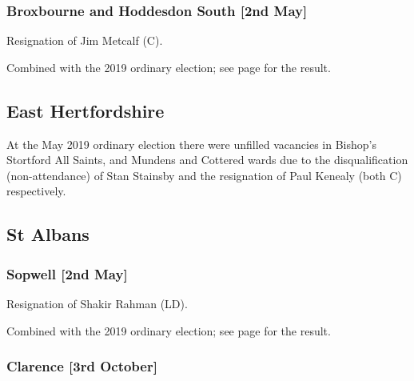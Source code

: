 \documentclass[a4paper,openany]{book}
\begin{document}
\begin{resultsiii}
\subsubsection*{Broxbourne and Hoddesdon South \hspace*{\fill}\nolinebreak[1]%
	\enspace\hspace*{\fill}
	[2nd May]}


Resignation of Jim Metcalf (C).

Combined with the 2019 ordinary election; see page \pageref{BroxbourneBroxbourneHoddesdonSouth} for the result.

\subsection*{East Hertfordshire}

At the May 2019 ordinary election there were unfilled vacancies in Bishop's Stortford All Saints, and Mundens and Cottered wards due to the disqualification (non-attendance) of Stan Stainsby and the resignation of Paul Kenealy (both C) respectively.

\subsection*{St Albans}

\subsubsection*{Sopwell \hspace*{\fill}\nolinebreak[1]%
	\enspace\hspace*{\fill}
	[2nd May]}


Resignation of Shakir Rahman (LD).

Combined with the 2019 ordinary election; see page \pageref{SopwellSaintAlbans} for the result.

\subsubsection*{Clarence \hspace*{\fill}\nolinebreak[1]%
	\enspace\hspace*{\fill}
	[3rd October]}


\end{resultsiii}
\end{document}
